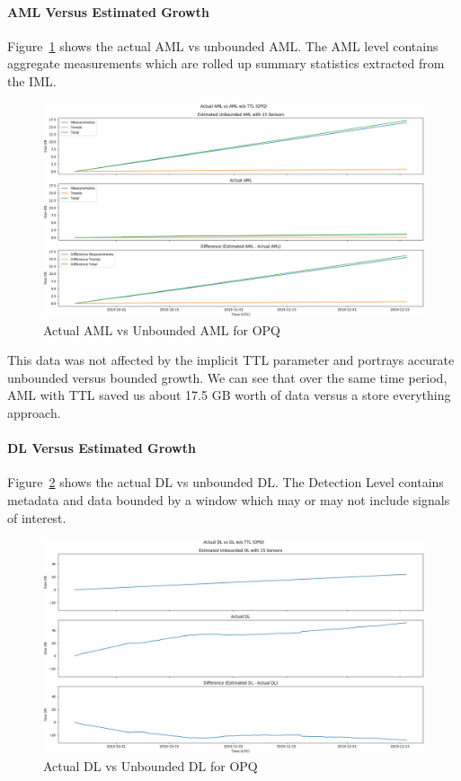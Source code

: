 \paragraph{AML Versus Estimated Growth}
Figure~\ref{fig:actual_aml_vs_unbounded_opq} shows the actual AML vs unbounded AML. The AML level contains aggregate measurements which are rolled up summary statistics extracted from the IML\@.

\begin{figure}[H]
    \centering
    \includegraphics[width=\linewidth]{figures/actual_aml_vs_unbounded_opq.png}
    \caption{Actual AML vs Unbounded AML for OPQ}
    \label{fig:actual_aml_vs_unbounded_opq}
\end{figure}

This data was not affected by the implicit TTL parameter and portrays accurate unbounded versus bounded growth. We can see that over the same time period, AML with TTL saved us about 17.5 GB worth of data versus a store everything approach.

\paragraph{DL Versus Estimated Growth}
Figure~\ref{fig:actual_dl_vs_unbounded_opq} shows the actual DL vs unbounded DL. The Detection Level contains metadata and data bounded by a window which may or may not include signals of interest.

\begin{figure}[H]
    \centering
    \includegraphics[width=\linewidth]{figures/actual_dl_vs_unbounded_opq.png}
    \caption{Actual DL vs Unbounded DL for OPQ}
    \label{fig:actual_dl_vs_unbounded_opq}
\end{figure}


